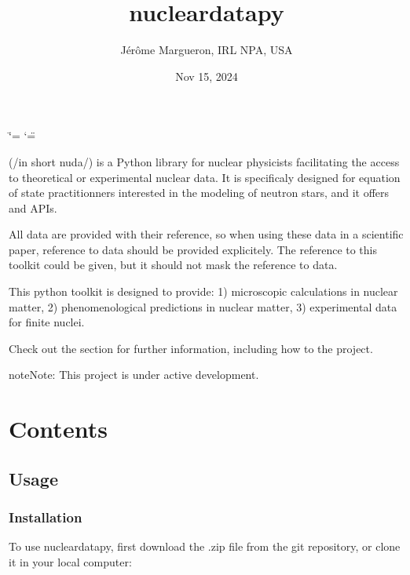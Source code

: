 \documentclass[letterpaper,10pt,english]{sphinxmanual}
\title{nucleardatapy}
\date{Nov 15, 2024}
\author{Jérôme Margueron, IRL NPA, USA}
\begin{document}
\ifdefined\shorthandoff
  \ifnum\catcode`\=\string=\active\shorthandoff{=}\fi
  \ifnum\catcode`\"=\active{}\fi
\fi

\pagestyle{empty}
\sphinxmaketitle
\pagestyle{plain}
\sphinxtableofcontents
\pagestyle{normal}
\label{\detokenize{index::doc}}


\sphinxAtStartPar
{} (/in short nuda/) is a Python library for nuclear physicists facilitating the access to theoretical or experimental nuclear data. It is specificaly designed for equation of state practitionners interested in the modeling of neutron stars, and it offers  and  APIs.

\sphinxAtStartPar
All data are provided with their reference, so when using these data in a scientific paper, reference to data should be provided explicitely. The reference to this toolkit could be given, but it should not mask the reference to data.

\sphinxAtStartPar
This python toolkit is designed to provide:
1) microscopic calculations in nuclear matter,
2) phenomenological predictions in nuclear matter,
3) experimental data for finite nuclei.

\sphinxAtStartPar
Check out the {\hyperref[\detokenize{source/usage::doc}]{}} section for further information, including how to
{\hyperref[\detokenize{source/usage:installation}]{}} the project.

\begin{sphinxadmonition}{note}{Note:}
\sphinxAtStartPar
This project is under active development.
\end{sphinxadmonition}


\chapter{Contents}
\label{\detokenize{index:contents}}
\sphinxstepscope


\section{Usage}
\label{\detokenize{source/usage:usage}}\label{\detokenize{source/usage::doc}}

\subsection{Installation}
\label{\detokenize{source/usage:installation}}\label{\detokenize{source/usage:id1}}
\sphinxAtStartPar
To use nucleardatapy, first download the .zip file from the git repository, or clone it in your local computer:
\end{document}
